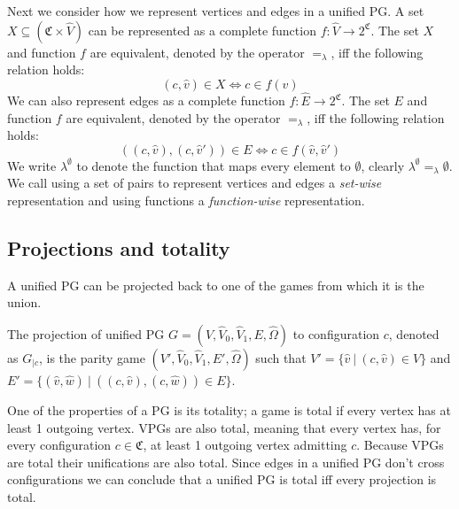 Next we consider how we represent vertices and edges in a unified PG. A set $X \subseteq (\mathfrak{C} \times \hat{V})$ can be represented as a complete function $f : \hat{V} \rightarrow 2^\mathfrak{C}$. The set $X$ and function $f$ are equivalent, denoted by the operator $=_\lambda$, iff the following relation holds:
\[ (c,\hat{v}) \in X \iff c \in f(\hat{v}) \]
We can also represent edges as a complete function $f : \hat{E} \rightarrow 2^\mathfrak{C}$. The set $E$ and function $f$ are equivalent, denoted by the operator $=_\lambda$, iff the following relation holds:
\[ ((c,\hat{v}),(c,\hat{v}')) \in E \iff c \in f(\hat{v},\hat{v}') \]
We write $\lambda^\emptyset$ to denote the function that maps every element to $\emptyset$, clearly $\lambda^\emptyset =_\lambda \emptyset$. We call using a set of pairs to represent vertices and edges a \textit{set-wise} representation and using functions a \textit{function-wise} representation.

\subsection{Projections and totality}
A unified PG can be projected back to one of the games from which it is the union.
\begin{definition}
	The projection of unified PG $G = (V,\hat{V}_0, \hat{V}_1,E,\hat{\Omega})$ to configuration $c$, denoted as $G_{|c}$, is the parity game $(V',\hat{V}_0,\hat{V}_1,E',\hat{\Omega})$ such that $V' = \{ \hat{v}\ |\ (c,\hat{v}) \in V \}$ and $E' = \{ (\hat{v},\hat{w})\ |\ ((c,\hat{v}),(c,\hat{w})) \in E \} $.
\end{definition}

One of the properties of a PG is its totality; a game is total if every vertex has at least 1 outgoing vertex. VPGs are also total, meaning that every vertex has, for every configuration $c \in \mathfrak{C}$, at least 1 outgoing vertex admitting $c$. Because VPGs are total their unifications are also total. Since edges in a unified PG don't cross configurations we can conclude that a unified PG is total iff every projection is total.